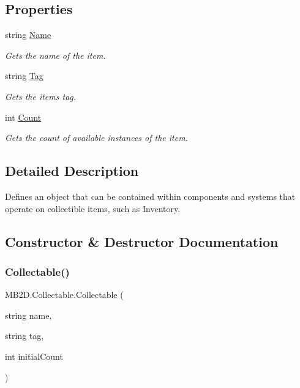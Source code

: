 \subsection*{Properties}
\begin{DoxyCompactItemize}
\item 
string \hyperlink{class_m_b2_d_1_1_collectable_a80d6ce8bb84f84a86ffbd58ad6237e9a}{Name}
\begin{DoxyCompactList}\small\item\em Gets the name of the item. \end{DoxyCompactList}\item 
string \hyperlink{class_m_b2_d_1_1_collectable_a97f42790fdafd06634b87cd4023bc0fe}{Tag}
\begin{DoxyCompactList}\small\item\em Gets the items tag. \end{DoxyCompactList}\item 
int \hyperlink{class_m_b2_d_1_1_collectable_a775364ada5d2f8095ca601657da20fc1}{Count}
\begin{DoxyCompactList}\small\item\em Gets the count of available instances of the item. \end{DoxyCompactList}\end{DoxyCompactItemize}


\subsection{Detailed Description}
Defines an object that can be contained within components and systems that operate on collectible items, such as Inventory. 



\subsection{Constructor \& Destructor Documentation}
\hypertarget{class_m_b2_d_1_1_collectable_af635d4c8ce7035b0553f0d0bf6c8a25e}{}\label{class_m_b2_d_1_1_collectable_af635d4c8ce7035b0553f0d0bf6c8a25e} 
\subsubsection{\texorpdfstring{Collectable()}{Collectable()}}
{\footnotesize\ttfamily M\+B2\+D.\+Collectable.\+Collectable (\begin{DoxyParamCaption}\item[{string}]{name,  }\item[{string}]{tag,  }\item[{int}]{initial\+Count }\end{DoxyParamCaption})\hspace{0.3cm}{\ttfamily [inline]}}



